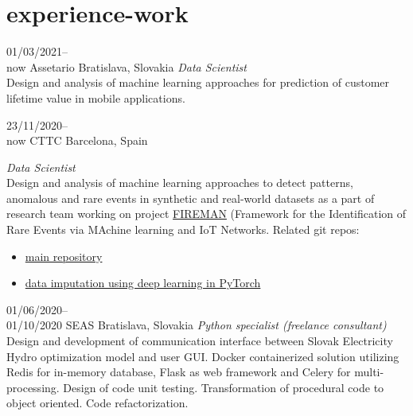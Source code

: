\documentclass[]{friggeri-cv} %
\begin{document}
\section{experience-work}

\begin{entrylist}

\entry
{01/03/2021--\\now}
{Assetario}
{Bratislava, Slovakia}
{\emph{Data Scientist}\\
Design and analysis of machine learning approaches for prediction of customer lifetime value in mobile applications.
}

\end{entrylist}

\begin{entrylist}

\entry
{23/11/2020--\\now}
{CTTC}
{Barcelona, Spain}
{\emph{Data Scientist}\\
Design and analysis of machine learning approaches to detect patterns, anomalous and rare events in synthetic and real-world datasets as a part of research team working on project \href{https://fireman-project.eu/}{FIREMAN} (Framework for the Identification of Rare Events via MAchine learning and IoT Networks.
Related git repos:
\begin{itemize}
	\item \href{https://github.com/5uperpalo/FIREMAN-project/}{main repository}
	\item \href{https://github.com/5uperpalo/FIREMAN-project_imputation/}{data imputation using deep learning in PyTorch}
\end{itemize}
}

\entry
{01/06/2020--\\01/10/2020}
{SEAS}
{Bratislava, Slovakia}
{\emph{Python specialist (freelance consultant)}\\
Design and development of communication interface between Slovak Electricity Hydro optimization model and user GUI. Docker containerized solution utilizing Redis for in-memory database, Flask as web framework and Celery for multi-processing. Design of code unit testing. Transformation of procedural code to object oriented. Code refactorization.
}
\end{entrylist}
\end{document}

